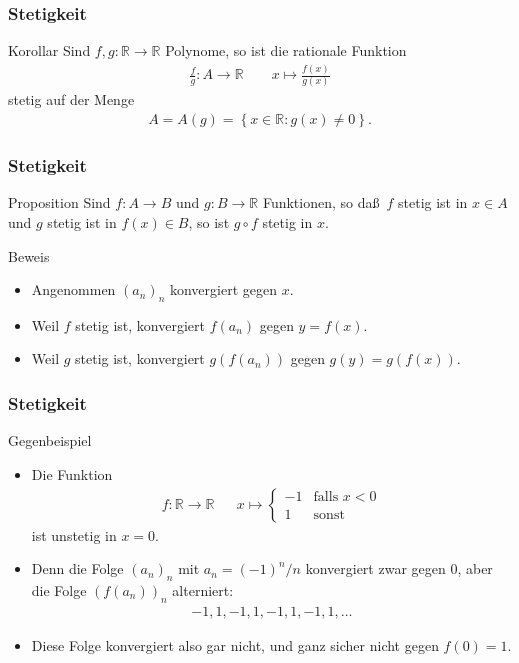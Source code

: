 \documentclass{beamer}
\newcommand\RR{\mathbb R}
\newcommand\cbc[1]{\left\{{#1}\right\}}
\newcommand{\mytitle}{Stetigkeit}
\begin{document}
\begin{frame}\frametitle{\mytitle}
	\begin{block}{Korollar}
		Sind $f,g:\RR\to\RR$ Polynome, so ist die rationale Funktion
		\begin{align*}
			\frac{f}{g}:A\to\RR\qquad x\mapsto\frac{f(x)}{g(x)}
		\end{align*}
		stetig auf der Menge
		\begin{align*}
			A=A(g)=\cbc{x\in\RR:g(x)\neq0}.
		\end{align*}
	\end{block}
\end{frame}

\begin{frame}\frametitle{\mytitle}
	\begin{block}{Proposition}
		Sind $f:A\to B$ und $g:B\to\RR$ Funktionen, so da\ss\ $f$ stetig ist in $x\in A$ und $g$ stetig ist in $f(x)\in B$, so ist $g\circ f$ stetig in $x$.
	\end{block}
	\begin{block}{Beweis}
	\begin{itemize}
		\item Angenommen $(a_n)_n$ konvergiert gegen $x$.
		\item Weil $f$ stetig ist, konvergiert $f(a_n)$ gegen $y=f(x)$.
		\item Weil $g$ stetig ist, konvergiert $g(f(a_n))$ gegen $g(y)=g(f(x))$.
	\end{itemize}
	\end{block}
\end{frame}

\begin{frame}\frametitle{\mytitle}
	\begin{block}{Gegenbeispiel}
	\begin{itemize}
	\item Die Funktion
		\begin{align*}
			f:\RR\to\RR&&x\mapsto\begin{cases}-1&\mbox{falls }x<0\\1&\mbox{sonst}\end{cases}
		\end{align*}
		ist unstetig in $x=0$.
	\item Denn die Folge $(a_n)_n$ mit $a_n=(-1)^n/n$ konvergiert zwar gegen $0$, aber die Folge $(f(a_n))_n$ alterniert:
		\begin{align*}
		-1,1,-1,1,-1,1,-1,1,\ldots
		\end{align*}
	\item Diese Folge konvergiert also gar nicht, und ganz sicher nicht gegen $f(0)=1$.
	\end{itemize}	
	\end{block}
\end{frame}
\end{document}

